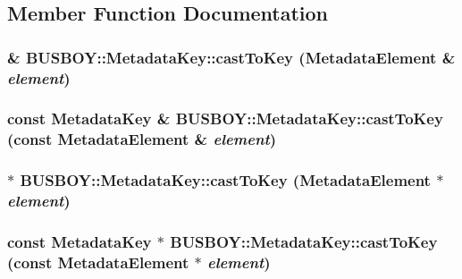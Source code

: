 \subsection{Member Function Documentation}
\hypertarget{classBUSBOY_1_1MetadataKey_af2e29faa901c76767d6dea20cfcd7b49}{
\subsubsection[{castToKey}]{ \& BUSBOY::MetadataKey::castToKey ({\bf MetadataElement} \& {\em element})}}
\label{classBUSBOY_1_1MetadataKey_af2e29faa901c76767d6dea20cfcd7b49}
\hypertarget{classBUSBOY_1_1MetadataKey_ad0be14983f1088f7b443bca4b21a0101}{
\subsubsection[{castToKey}]{\setlength{\rightskip}{0pt plus 5cm}const {\bf MetadataKey} \& BUSBOY::MetadataKey::castToKey (const {\bf MetadataElement} \& {\em element})}}
\label{classBUSBOY_1_1MetadataKey_ad0be14983f1088f7b443bca4b21a0101}
\hypertarget{classBUSBOY_1_1MetadataKey_a4acf5c0d13dd4aace082446e23ceb016}{
\subsubsection[{castToKey}]{ $\ast$ BUSBOY::MetadataKey::castToKey ({\bf MetadataElement} $\ast$ {\em element})}}
\label{classBUSBOY_1_1MetadataKey_a4acf5c0d13dd4aace082446e23ceb016}
\hypertarget{classBUSBOY_1_1MetadataKey_ad6cd3c3e919a8f3bffa8df52e04ed1a1}{
\subsubsection[{castToKey}]{\setlength{\rightskip}{0pt plus 5cm}const {\bf MetadataKey} $\ast$ BUSBOY::MetadataKey::castToKey (const {\bf MetadataElement} $\ast$ {\em element})}}

